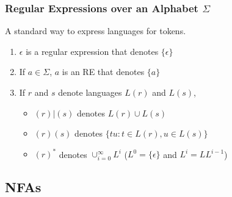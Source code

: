 \documentclass{plt}
\begin{document}
\begin{frame}
  \frametitle{Regular Expressions over an Alphabet $\Sigma$}

A standard way to express languages for tokens.

\begin{enumerate}

\item $\epsilon$ is a regular expression that denotes $\{\epsilon\}$

\item If $a \in \Sigma$, $a$ is an RE that denotes $\{a\}$

\item If $r$ and $s$ denote languages $L(r)$ and $L(s)$,

\begin{itemize}

\item  $(r)|(s)$ denotes $L(r) \cup L(s)$
\item $(r)(s)$ denotes $\{ tu : t \in L(r), u \in L(s) \}$
\item $(r)^*$ denotes $\cup_{i=0}^{\infty} L^i$ ($L^0 =
  \{\epsilon\}$ and $L^i = L L^{i-1}$)
\end{itemize}

\end{enumerate}

\end{frame}

\subsection{NFAs}
\end{document}
